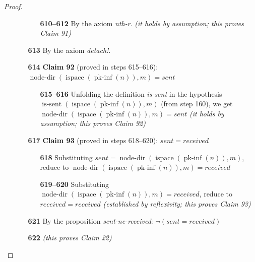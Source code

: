 \documentclass[11pt]{article}
\theoremstyle{plain}
\begin{document}
\begin{proof}
\begin{itemize}[leftmargin=2.8em, itemsep=4pt, parsep=1pt]
\begin{itemize}[leftmargin=2.8em, itemsep=4pt, parsep=1pt]
  \begin{itemize}[leftmargin=2.8em, itemsep=4pt, parsep=1pt]
  \item[\textbf{610--612}] By the axiom \emph{nth-r}.  \emph{(it holds by assumption; this proves Claim 91)}
  \end{itemize}
  \item[\textbf{613}] By the axiom \emph{detach!}.
  \item[\textbf{614}] \textbf{Claim 92} (proved in steps 615--616): $\operatorname{node\text{-}dir}(\operatorname{ispace}(\operatorname{pk\text{-}inf}(n)), m) = \mathit{sent}$
  \begin{itemize}[leftmargin=2.8em, itemsep=4pt, parsep=1pt]
  \item[\textbf{615--616}] Unfolding the definition \emph{is-sent} in the hypothesis $\operatorname{is\text{-}sent}(\operatorname{ispace}(\operatorname{pk\text{-}inf}(n)), m)$ (from step 160), we get $\operatorname{node\text{-}dir}(\operatorname{ispace}(\operatorname{pk\text{-}inf}(n)), m) = \mathit{sent}$  \emph{(it holds by assumption; this proves Claim 92)}
  \end{itemize}
  \item[\textbf{617}] \textbf{Claim 93} (proved in steps 618--620): $\mathit{sent} = \mathit{received}$
  \begin{itemize}[leftmargin=2.8em, itemsep=4pt, parsep=1pt]
  \item[\textbf{618}] Substituting $\mathit{sent} = \operatorname{node\text{-}dir}(\operatorname{ispace}(\operatorname{pk\text{-}inf}(n)), m)$, reduce to $\operatorname{node\text{-}dir}(\operatorname{ispace}(\operatorname{pk\text{-}inf}(n)), m) = \mathit{received}$
  \item[\textbf{619--620}] Substituting $\operatorname{node\text{-}dir}(\operatorname{ispace}(\operatorname{pk\text{-}inf}(n)), m) = \mathit{received}$, reduce to $\mathit{received} = \mathit{received}$  \emph{(established by reflexivity; this proves Claim 93)}
  \end{itemize}
  \item[\textbf{621}] By the proposition \emph{sent-ne-received}: $\neg (\mathit{sent} = \mathit{received})$
  \item[\textbf{622}]   \emph{(this proves Claim 22)}
  \end{itemize}
\end{itemize}
\end{proof}
\end{document}
